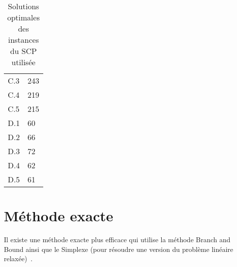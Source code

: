 \documentclass[12pt,letterpaper,twoside]{article}
\begin{document}
\begin{table}[H]
\begin{minipage}[t]{0.45\linewidth}
\begin{tabular}{*{2}{C{65pt}}}
					C.3 & 243\\
					C.4 & 219\\
					C.5 & 215\\
					\midrule
					D.1 & 60\\
					D.2 & 66\\
					D.3 & 72\\
					D.4 & 62\\
					D.5 & 61\\
					\bottomrule
				\end{tabular}
			\end{minipage}
			\caption{Solutions optimales des instances du SCP utilisée\cite{Beasley1990}}
			\label{table:problem_optimal_solutions}
		\end{table}
	\section{Méthode exacte}
		\paragraph*{}
			Il existe une méthode exacte plus efficace qui utilise la méthode Branch and Bound ainsi que le Simplexe (pour résoudre une version
			du problème linéaire relaxée)~\cite{caprara2000algorithms}.
	\newpage\printbibliography[heading=bibintoc]{}
\end{document}

